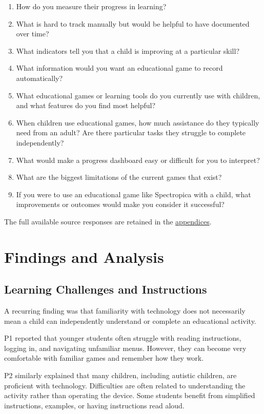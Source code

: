 \documentclass[12pt, titlepage]{article}
\begin{document}
\begin{enumerate}
  such as difficulty, visuals, sounds, instructions, or activity duration?
\item How do you measure their progress in learning?
\item What is hard to track manually but would be helpful to have documented
  over time?
\item What indicators tell you that a child is improving at a particular skill?
\item What information would you want an educational game to record
  automatically?
\item What educational games or learning tools do you currently use with
  children, and what features do you find most helpful?
\item When children use educational games, how much assistance do they
  typically need from an adult? Are there particular tasks they struggle to
  complete independently?
\item What would make a progress dashboard easy or difficult for you to
  interpret?
\item What are the biggest limitations of the current games that exist?
\item If you were to use an educational game like Spectropica with a child,
  what improvements or outcomes would make you consider it successful?
\end{enumerate}

The full available source responses are retained in the \hyperref[app:interview-responses]{appendices}.

\section{Findings and Analysis}

\subsection{Learning Challenges and Instructions}

A recurring finding was that familiarity with technology does not necessarily mean a child can independently understand or complete an educational activity.

P1 reported that younger students often struggle with reading instructions, logging in, and navigating unfamiliar menus. However, they can become very comfortable with familiar games and remember how they work.

P2 similarly explained that many children, including autistic children, are proficient with technology. Difficulties are often related to understanding the activity rather than operating the device. Some students benefit from simplified instructions, examples, or having instructions read aloud.
\end{document}
